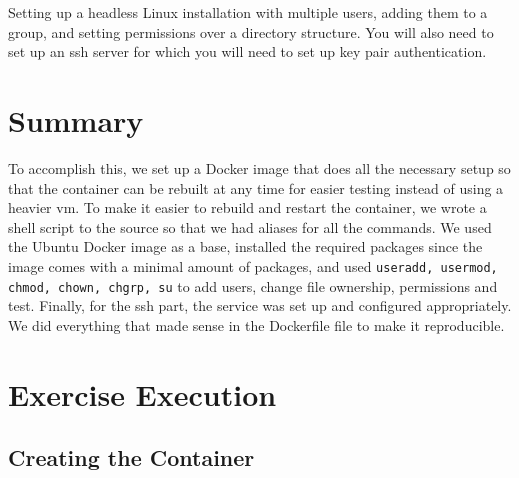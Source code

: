 \documentclass[a4paper]{article}
\begin{document}
Setting up a headless Linux installation with multiple users, adding them to a group, and setting permissions over a directory structure. You will also need to set up an ssh server for which you will need to set up key pair authentication.


\section{Summary}

To accomplish this, we set up a Docker image that does all the necessary setup so that the container can be rebuilt at any time for easier testing instead of using a heavier vm. To make it easier to rebuild and restart the container, we wrote a shell script to the source so that we had aliases for all the commands. We used the Ubuntu Docker image as a base, installed the required packages since the image comes with a minimal amount of packages, and used \texttt{useradd, usermod, chmod, chown, chgrp, su} to add users, change file ownership, permissions and test. Finally, for the ssh part, the service was set up and configured appropriately. We did everything that made sense in the Dockerfile file to make it reproducible. 


\newpage

\section{Exercise Execution}

\subsection{Creating the Container}
\end{document}
